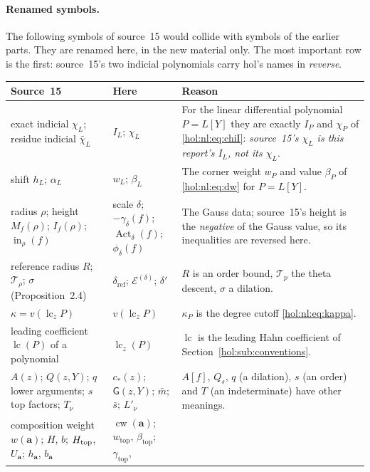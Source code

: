 \documentclass[11pt]{article}
\numberwithin{equation}{section}
\theoremstyle{definition}
\theoremstyle{remark}
\newcommand{\lc}{\operatorname{lc}}
\begin{document}
\paragraph{Renamed symbols.}
The following symbols of source~15 would collide with symbols of the earlier
parts. They are renamed here, in the new material only. The most important
row is the first: source~15's two indicial polynomials carry hol's names in
\emph{reverse}.
{\small
\begin{longtable}{@{}>{\raggedright\arraybackslash}p{}
>{\raggedright\arraybackslash}p{}
>{\raggedright\arraybackslash}p{}@{}}
\toprule
Source~15 & Here & Reason\\
\midrule
\endhead
exact indicial $\chi_L$; residue indicial $\bar\chi_L$ & $I_L$; $\chi_L$ &
For the linear differential polynomial $P=L[Y]$ they are exactly $I_P$ and
$\chi_P$ of \eqref{hol:nl:eq:chiI}: \emph{source~15's $\chi_L$ is this report's
$I_L$, not its $\chi_L$}.\\
shift $h_L$; $\alpha_L$ & $w_L$; $\beta_L$ & The corner weight $w_P$ and value
$\beta_P$ of \eqref{hol:nl:eq:dw} for $P=L[Y]$.\\
radius $\rho$; height $M_f(\rho)$; $I_f(\rho)$; $\operatorname{in}_\rho(f)$ & scale
$\delta$; $-\gamma_\delta(f)$; $\operatorname{Act}_\delta(f)$; $\phi_\delta(f)$ &
The Gauss data; source~15's height is the \emph{negative} of the Gauss value,
so its inequalities are reversed here.\\
reference radius $R$; $\mathcal T_\rho$; $\sigma$ (Proposition~2.4) &
$\delta_{\mathrm{ref}}$; $\mathcal E^{(\delta)}$; $\delta'$ & $R$ is an order
bound, $\mathcal T_p$ the theta descent, $\sigma$ a dilation.\\
$\kappa=v(\lc_z P)$ & $v(\lc_z P)$ & $\kappa_P$ is the degree cutoff
\eqref{hol:nl:eq:kappa}.\\
leading coefficient $\operatorname{lc}(P)$ of a polynomial & $\lc_z(P)$ &
$\lc$ is the leading Hahn coefficient of Section~\ref{hol:sub:conventions}.\\
$A(z)$; $Q(z,Y)$; $q$ lower arguments; $s$ top factors; $T_\nu$ &
$c_*(z)$; $\mathsf G(z,Y)$; $\bar m$; $\bar s$; $L'_\nu$ & $A[f]$, $Q_s$, $q$
(a dilation), $s$ (an order) and $T$ (an indeterminate) have other
meanings.\\
composition weight $w(\boldsymbol a)$; $H$, $b$; $H_{\rm top}$, $U_{\boldsymbol
a}$; $h_{\boldsymbol a}$, $b_{\boldsymbol a}$ & $\operatorname{cw}(\mathbf a)$;
$w_{\mathrm{top}}$, $\beta_{\mathrm{top}}$; $\gamma_{\mathrm{top}}$,

\end{longtable}}
\end{document}
